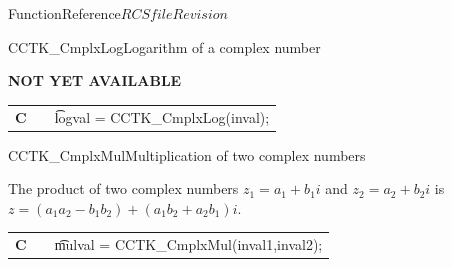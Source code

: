\begin{cactuspart}{FunctionReference}{$RCSfile$}{$Revision$}
\begin{CCTKFunc}{CCTK\_CmplxLog}{Logarithm of a complex number}
\label{CCTK-CmplxLog}
\showcargs
\begin{params}
\end{params}
\begin{discussion}
{\bf NOT YET AVAILABLE}
\end{discussion}
\begin{examples}
\begin{tabular}{@{}p{3cm}cp{11cm}}
\hfill {\bf C} && {\t logval = CCTK\_CmplxLog(inval)};
\end{tabular}
\end{examples}
\begin{errorcodes}
\end{errorcodes}
\end{CCTKFunc}

\begin{CCTKFunc}{CCTK\_CmplxMul}{Multiplication of two complex numbers}
\label{CCTK-CmplxMul}
\showcargs
\begin{params}
\end{params}
\begin{discussion}
The product of two complex numbers $z_1=a_1+b_1 i$ and $z_2=a_2+b_2 i$ is
$z=(a_1 a_2 - b_1 b_2) + (a_1 b_2 + a_2 b_1)i$.
\end{discussion}
\begin{examples}
\begin{tabular}{@{}p{3cm}cp{11cm}}
\hfill {\bf C} && {\t mulval = CCTK\_CmplxMul(inval1,inval2)};
\end{tabular}
\end{examples}
\begin{errorcodes}
\end{errorcodes}
\end{CCTKFunc}




\end{cactuspart}
